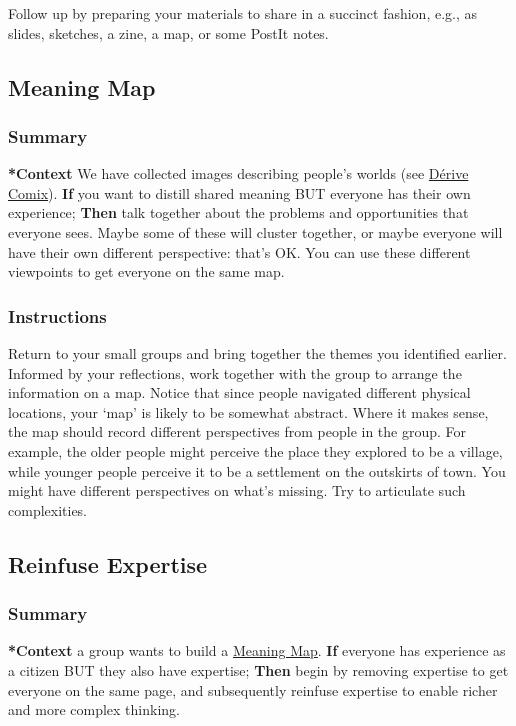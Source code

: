 \documentclass{article}
\begin{document}
Follow up by preparing your materials to share in a succinct fashion,
e.g., as slides, sketches, a zine, a map, or some PostIt notes.
\subsection{Meaning Map}
\label{407beae8-ab2f-4340-9552-211d3b92ede6}
\subsubsection{Summary}

\textbf{*Context} We have collected images describing people's worlds (see
\hyperref[615846a2-1795-40b4-8dfb-3e12923fccc0]{Dérive Comix}). \textbf{If} you want to distill shared meaning BUT everyone has
their own experience; \textbf{Then} talk together about the problems and
opportunities that everyone sees. Maybe some of these will cluster
together, or maybe everyone will have their own different perspective:
that's OK. You can use these different viewpoints to get everyone on
the same map.

\subsubsection{Instructions}

Return to your small groups and bring together the themes you
identified earlier.  Informed by your reflections, work together with
the group to arrange the information on a map.  Notice that since
people navigated different physical locations, your ‘map’ is likely to
be somewhat abstract.  Where it makes sense, the map should record
different perspectives from people in the group.  For example, the
older people might perceive the place they explored to be a village,
while younger people perceive it to be a settlement on the outskirts
of town.  You might have different perspectives on what’s missing.
Try to articulate such complexities.
\subsection{Reinfuse Expertise}
\label{bf8791b5-e50b-4666-bc01-286e279a5971}
\subsubsection{Summary}

\textbf{*Context} a group wants to build a \hyperref[407beae8-ab2f-4340-9552-211d3b92ede6]{Meaning Map}. \textbf{If} everyone has
experience as a citizen BUT they also have expertise; \textbf{Then} begin by
removing expertise to get everyone on the same page, and subsequently
reinfuse expertise to enable richer and more complex thinking.
\end{document}
